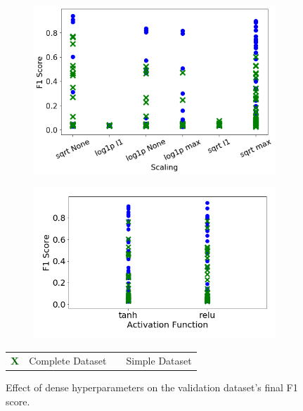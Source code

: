\begin{figure}[H]
    \begin{subfigure}[b]{0.49\textwidth}
        \centering
        \includegraphics[width=\textwidth]{images/dnn_scaler.png}
         \caption{}
        \label{fig:dnn_scaler}
    \end{subfigure}
    \hfill
    \begin{subfigure}[b]{0.49\textwidth}
        \centering
        \includegraphics[width=\textwidth]{images/dnn_activation_function.png}
         \caption{}
        \label{fig:dnn_activation_function}
    \end{subfigure}
        \begin{tabular}{r@{ : }l r@{ : }l}
			\textcolor{darkgreen}{\textbf{\large{X}}} & Complete Dataset & \bluecircle & Simple Dataset \\
		\end{tabular}
        \caption{Effect of dense hyperparameters on the validation dataset's final F1 score.}
        \label{fig:dense_hyperparameters_f1_score}
\end{figure}


